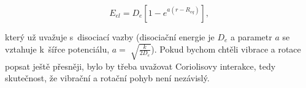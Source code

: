 \begin{equation}
E_{el}=D_e\left[1-e^{a(r-R_{eq})}\right],
\end{equation}

\noindent který už uvažuje s~disociací vazby (disociační energie je $D_e$ a parametr $a$ se vztahuje k~šířce potenciálu, $a=\sqrt[]{\frac{k}{2D_e}}$).
\noindent Pokud bychom chtěli vibrace a rotace popsat ještě přesněji, bylo by třeba uvažovat Coriolisovy interakce, tedy skutečnost, že vibrační a rotační pohyb není nezávislý.





